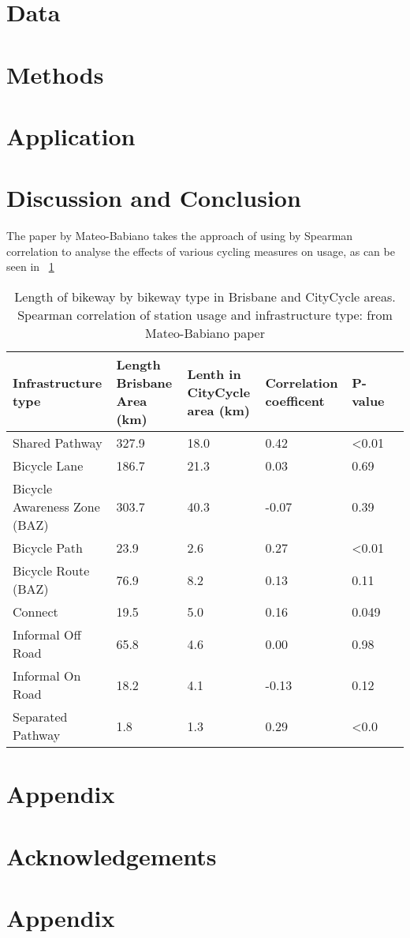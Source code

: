 \documentclass[12pt, letterpaper]{article}
\begin{document}
\section{Data}
\label{sec:data}



\section{Methods}
\label{sec:methods}


\section{Application}
\label{sec:application}


\section{Discussion and Conclusion}
\label{sec:discandconclus}

The paper by Mateo-Babiano takes the approach of using by Spearman correlation to analyse the effects of various cycling measures on usage, as can be seen in ~\ref{fig:Mateo-Babiano}

\begin{table}[tbp]
\small
\label{fig:Mateo-Babiano}
\centering
\caption{Length of bikeway by bikeway type in Brisbane and CityCycle areas. Spearman correlation of station usage and infrastructure type: from Mateo-Babiano paper}
\begin{tabular}{l*{5}{p{1.5cm}}}
\toprule
{Infrastructure type} & {Length Brisbane Area (km)} & {Lenth in CityCycle area (km)} & {Correlation coefficent} & {P-value}\\
\midrule
Shared Pathway & 327.9 & 18.0 & 0.42 & <0.01 \\
Bicycle Lane & 186.7 & 21.3 & 0.03 & 0.69 \\
Bicycle Awareness Zone (BAZ) & 303.7 & 40.3 & -0.07 & 0.39 \\
Bicycle Path & 23.9 & 2.6 & 0.27 & <0.01 \\
Bicycle Route (BAZ) & 76.9 & 8.2 & 0.13 & 0.11 \\
Connect & 19.5 & 5.0 & 0.16 & 0.049 \\
Informal Off Road & 65.8 & 4.6 & 0.00 & 0.98 \\
Informal On Road & 18.2 & 4.1 & -0.13 & 0.12 \\
Separated Pathway & 1.8 & 1.3 & 0.29 & <0.0 \\
\bottomrule
\end{tabular}
\end{table}


\section{Appendix}
\label{sec:appendix}


\section{Acknowledgements}
\label{sec:acknow}


\section{Appendix}
\label{sec:appendix}


\end{document}
